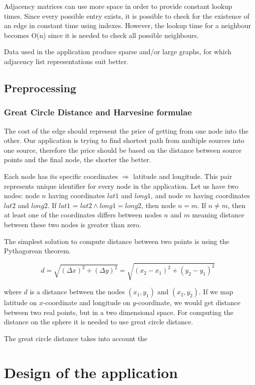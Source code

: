 \documentclass[thesis=M,english]{FITthesis}[2012/10/20]
\begin{document}
Adjacency matrices can use more space in order to provide constant lookup times. Since every possible entry exists, it is possible to check for the existence of an edge in constant time using indexes. However, the lookup time for a neighbour becomes O(n) since it is needed to check all possible neighbours.

Data used in the application produce sparse and/or large graphs, for which adjacency list representations suit better.



\section{Preprocessing}

\subsection{Great Circle Distance and Harvesine formulae}
The cost of the edge should represent the price of getting from one node into the other. Our application is trying to find shortest path from multiple sources into one source, therefore the price should be based on the distance between source points and the final node, the shorter the better. 

Each node has its specific coordinates $\Rightarrow$ latitude and longitude. This pair represents unique identifier for every node in the application. Let us have two nodes: node $n$ having coordinates $lat1$ and $long1$, and node $m$ having coordinates $lat2$ and $long2$. If $lat1$ = $lat2 \wedge long1 = long2$, then node $n = m$. If $n \neq m$, then at least one of the coordinates differs between nodes $n$ and $m$ meaning distance between these two nodes is greater than zero.

The simplest solution to compute distance between two points is using the Pythagorean theorem.

$$
d = \sqrt{(\Delta x)^2 + (\Delta y)^2} = \sqrt{(x_2 - x_1 )^2 + (y_2 - y_1)^2}
$$

where $d$ is a distance between the nodes $(x_1, y_1)$ and $(x_2, y_2)$. If we map latitude on $x$-coordinate and longitude on $y$-coordinate, we would get distance between two real points, but in a two dimensional space. For computing the distance on the sphere it is needed to use great circle distance.

The great circle distance takes into account the 


\chapter{Design of the application}
\label{ch:DOTA}
\end{document}
